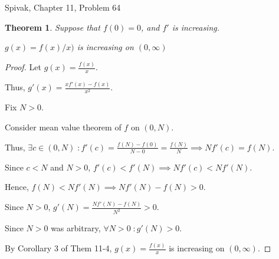 \documentclass{article} %
\theoremstyle{plain}
\newtheorem*{theorem*}{Theorem}
\theoremstyle{definition}
\begin{document}
\noindent{} Spivak, Chapter 11, Problem 64

\begin{theorem*}
    Suppose that $f(0) = 0$, and $f'$ is increasing.

    $g(x) = f(x)/x)$ is increasing on $(0, \infty)$
\end{theorem*}

\begin{proof}
    Let $g(x) = \frac{f(x)}{x}$.

    Thus, $g'(x) = \frac{x f'(x) - f(x)}{x^2}$.

    Fix $N > 0$.

    Consider mean value theorem of $f$ on $(0, N)$.

    Thus, $\exists c \in (0, N) \; \colon f'(c) = \frac{f(N) - f(0)}{N - 0} = \frac{f(N)}{N} \implies N f'(c) = f(N)$.

    Since $c < N$ and $N > 0$, $f'(c) < f'(N) \implies N f'(c) < N f'(N)$.

    Hence, $f(N) < N f'(N) \implies N f'(N) - f(N) > 0$.

    Since $N > 0$, $g'(N) = \frac{N f'(N) - f(N)}{N^2} > 0$.

    Since $N > 0$ was arbitrary, $\forall N > 0 \; \colon g'(N) > 0$.

    By Corollary 3 of Them 11-4, $g(x) = \frac{f(x)}{x}$ is increasing on $(0, \infty)$.
\end{proof}
\end{document}
